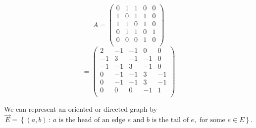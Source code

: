 $$ A = \begin{pmatrix}
     0    &     1    &     1    &     0    &     0    \\
     1    &     0    &     1    &     1    &     0    \\
     1    &     1    &     0    &     1    &     0    \\
     0    &     1    &     1    &     0    &     1    \\
     0    &     0    &     0    &     1    &     0    \\
\end{pmatrix}$$
$$= \begin{pmatrix}
     2    &    -1    &    -1    &     0    &     0    \\
    -1    &     3    &    -1    &    -1    &     0    \\
    -1    &    -1    &     3    &    -1    &     0    \\
     0    &    -1    &    -1    &     3    &    -1    \\
     0    &    -1    &    -1    &     3    &    -1    \\
     0    &     0    &     0    &    -1    &     1    \\
\end{pmatrix}$$

We can represent an oriented or directed graph by
$$\overrightarrow{E} = \left\{ (a,b) \, : \, a
\text{ is the head of an edge } e \text{ and }
b \text{ is the tail of } e, 
\text{ for some } e \in E \right\}.$$

